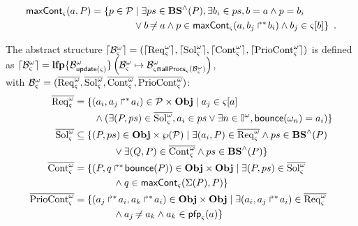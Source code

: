 \begin{definition}[$\gCont_\ctx : \Sigma \times \Obj \mapsto \powerset(\Proc)$]
  \label{def:maxCont}
  \begin{align*}
    \mathsf{maxCont}_\varsigma(a,P) = 
    \{ p \in \mathcal{P} &\mid \exists ps \in \mathbf{BS}^\wedge(P), \exists b_i \in ps, b = a \wedge p = b_i \\
      & \vee b \not\nobreak\mkern -2mu = a \wedge p \in \mathsf{maxCont}_\varsigma(a, \mbox{$b_j\Rsh^*\!b_i$}) \wedge b_j \in {\varsigma[b]} \}
    \enspace.
  \end{align*}
\end{definition}

\begin{definition}
  \label{def:aS}
  The abstract structure $\lceil \mathcal{B}_\varsigma^\omega\rceil=(\lceil \mathrm{Req}^\omega_\varsigma\rceil,\lceil \mathrm{Sol}^\omega_\varsigma\rceil,\lceil \mathrm{Cont}^\omega_\varsigma\rceil,\lceil \mathrm{PrioCont}^\omega_\varsigma\rceil)$ is defined as
  $\lceil \mathcal{B}_\varsigma^\omega\rceil = \mathbf{lfp}\{\mathcal{B}^\omega_{\mathsf{update}(\varsigma)}\}\left(\mathcal{B}^\omega_\varsigma\mapsto\mathcal{B}^\omega_{\varsigma \Cap \mathsf{allProcs}_\varsigma(\mathcal{B}^\omega_\varsigma)}\right)$,\\
  with $\mathcal{B}^\omega_\varsigma=(\overline{\mathrm{Req}^\omega_\varsigma},\overline{\mathrm{Sol}^\omega_\varsigma},\overline{\mathrm{Cont}^\omega_\varsigma},\overline{\mathrm{PrioCont}^\omega_\varsigma})$:
  \begin{align*}
    \myreq &= \{ (a_i,\PHobjp{a}{j}{i}) \in \PHproc \times \Obj \mid
      a_j \in \PHget{\ctx}{a} \\ %
      & \qquad \wedge (\exists (P,ps) \in \mysol, a_i \in ps \vee \exists n \in \indexes{\w}, \PHbounce(\w_n)=a_i) \}
    \\
    \mysol &\subseteq \{ (P,ps) \in \Obj \times \powerset(\PHproc) \mid
            \exists (a_i, P) \in \myreq \wedge ps \in \aBS(P) \\
      & \qquad\qquad \vee \exists (Q, P) \in \mycont \wedge ps \in \aBS(P) \}
    \\
    \mycont & = \{ (P, \PHobj{q}{\PHbounce(P)}) \in \Obj \times \Obj \mid
      \exists (P, ps) \in \mysol \\
      & \qquad\qquad \wedge q \in \gCont_\ctx(\PHsort(P),P) \}
    \\
    \mysat & = \{ (\PHobjp{a}{j}{i}, \PHobjp{a}{k}{i}) \in \Obj \times \Obj \mid
      \exists (a_i, \PHobj{a_j}{a_i}) \in \myreq\\
      & \qquad\qquad \wedge a_j \neq a_k \wedge a_k \in \pfp_\ctx(a) \}
  \end{align*}
\end{definition}

